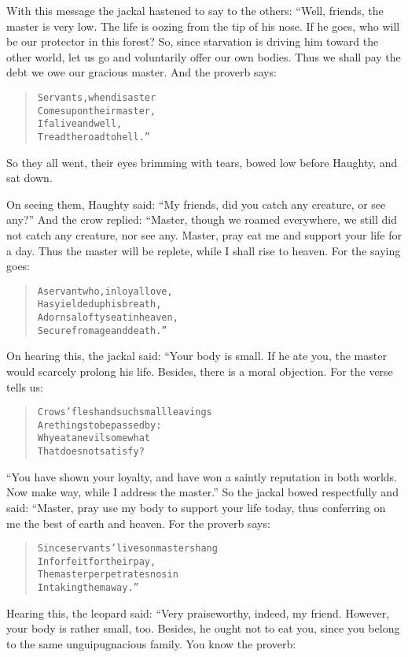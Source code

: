 \documentclass[article, twoside, 14pt]{memoir}
\renewenvironment{verbatim}{%
\begin{quote}%
\vskip -10pt%
\begin{alltt}\normalfont\large}{\end{alltt}%
\end{quote}%
\vskip -10pt
} %
\begin{document}
With this message the jackal hastened to say to the others: “Well,
friends, the master is very low. The life is oozing from the tip of
his nose. If he goes, who will be our protector in this forest? So,
since starvation is driving him toward the other world, let us go
and voluntarily offer our own bodies. Thus we shall pay the debt we
owe our gracious master. And the proverb says:

\begin{verbatim}
Servants, when disaster
Comes upon their master,
If alive and well,
Tread the road to hell.”
\end{verbatim}
So they all went, their eyes brimming with tears, bowed low before
Haughty, and sat down.

On seeing them, Haughty said:
``My friends, did you catch any creature, or see any?'' And the
crow replied: “Master, though we roamed everywhere, we still did
not catch any creature, nor see any. Master, pray eat me and
support your life for a day. Thus the master will be replete, while
I shall rise to heaven. For the saying goes:

\begin{verbatim}
A servant who, in loyal love,
Has yielded up his breath,
Adorns a lofty seat in heaven,
Secure from age and death.”
\end{verbatim}
On hearing this, the jackal said: “Your body is small. If he ate
you, the master would scarcely prolong his life. Besides,
there is a moral objection. For the verse tells us:

\begin{verbatim}
Crows' flesh and such small leavings
    Are things to be passed by:
Why eat an evil somewhat
    That does not satisfy?
\end{verbatim}
``You have shown your loyalty, and have won a saintly reputation in both worlds. Now make way, while I address the master.''
So the jackal bowed respectfully and said: “Master, pray use my
body to support your life today, thus conferring on me the best of
earth and heaven. For the proverb says:

\begin{verbatim}
Since servants' lives on masters hang
    In forfeit for their pay,
The master perpetrates no sin
    In taking them away.”
\end{verbatim}
Hearing this, the leopard said: “Very praiseworthy, indeed, my
friend. However, your body is rather small, too. Besides, he ought
not to eat you, since you belong to the same unguipugnacious
family. You know the proverb:
\end{document}

